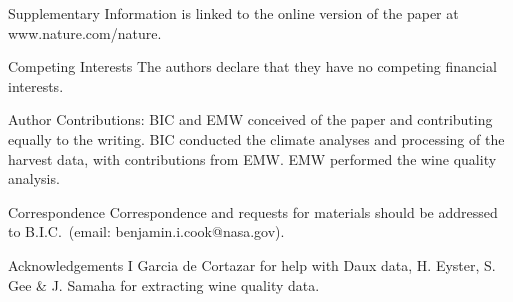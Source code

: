 \documentclass[final]{nature}
\begin{document}
\begin{addendum}
 \item [Supplementary Information] is linked to the online version of the paper at www.nature.com/nature.
 \item[Competing Interests] The authors declare that they have no
competing financial interests.
\item [Author Contributions:] BIC and EMW conceived of the paper and contributing equally to the writing. BIC conducted the climate analyses and processing of the harvest data, with contributions from EMW. EMW performed the wine quality analysis.
 \item[Correspondence] Correspondence and requests for materials
should be addressed to B.I.C.~(email: benjamin.i.cook@nasa.gov).
 \item[Acknowledgements] I Garcia de Cortazar for help with Daux data, H. Eyster, S. Gee \& J. Samaha for extracting wine quality data.
\end{addendum}
\end{document}
